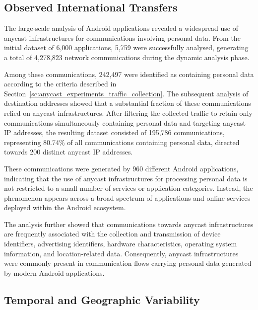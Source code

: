 \subsection{Observed International Transfers}
\label{sc:anycast_experiments_observed_transfers}

The large-scale analysis of Android applications revealed a widespread use of anycast infrastructures for communications involving personal data. From the initial dataset of 6,000 applications, 5,759 were successfully analysed, generating a total of 4,278,823 network communications during the dynamic analysis phase.

Among these communications, 242,497 were identified as containing personal data according to the criteria described in Section~\ref{sc:anycast_experiments_traffic_collection}. The subsequent analysis of destination addresses showed that a substantial fraction of these communications relied on anycast infrastructures. After filtering the collected traffic to retain only communications simultaneously containing personal data and targeting anycast IP addresses, the resulting dataset consisted of 195,786 communications, representing 80.74\% of all communications containing personal data, directed towards 200 distinct anycast IP addresses.

These communications were generated by 960 different Android applications, indicating that the use of anycast infrastructures for processing personal data is not restricted to a small number of services or application categories. Instead, the phenomenon appears across a broad spectrum of applications and online services deployed within the Android ecosystem.

The analysis further showed that communications towards anycast infrastructures are frequently associated with the collection and transmission of device identifiers, advertising identifiers, hardware characteristics, operating system information, and location-related data. Consequently, anycast infrastructures were commonly present in communication flows carrying personal data generated by modern Android applications.

\subsection{Temporal and Geographic Variability}
\label{sc:anycast_experiments_variability}


